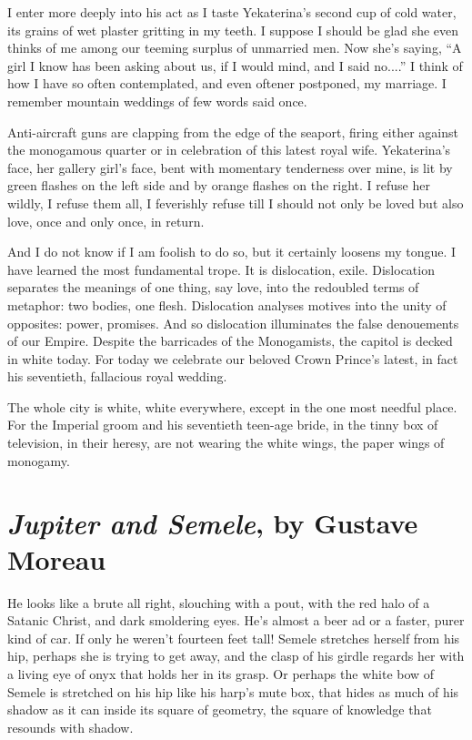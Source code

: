 \documentclass[english,11pt,letterpaper,onecolumn,parskip=full]{scrbook}
\begin{document}
	I enter more deeply into his act as I taste Yekaterina's second cup of cold water, its grains of wet plaster gritting in my teeth.  I suppose I should be glad she even thinks of me among our teeming surplus of unmarried men.  Now she's saying, ``A girl I know has been asking about us, if I would mind, and I said no....''  I think of how I have so often contemplated, and even oftener postponed, my marriage.  I remember mountain weddings of few words said once.

	Anti-aircraft guns are clapping from the edge of the seaport, firing either against the monogamous quarter or in celebration of this latest royal wife.  Yekaterina's face, her gallery girl's face, bent with momentary tenderness over mine, is lit by green flashes on the left side and by orange flashes on the right.  I refuse her wildly, I refuse them all, I feverishly refuse till I should not only be loved but also love, once and only once, in return.

	And I do not know if I am foolish to do so, but it certainly loosens my tongue.  I have learned the most fundamental trope.  It is dislocation, exile.  Dislocation separates the meanings of one thing, say love, into the redoubled terms of metaphor:  two bodies, one flesh.  Dislocation analyses motives into the unity of opposites:  power, promises.  And so dislocation illuminates the false denouements of our Empire.  Despite the barricades of the Monogamists, the capitol is decked in white today.  For today we celebrate our beloved Crown Prince's latest, in fact his seventieth, fallacious royal wedding.

	The whole city is white, white everywhere, except in the one most needful place.  For the Imperial groom and his seventieth teen-age bride, in the tinny box of television, in their heresy, are not wearing the white wings, the paper wings of monogamy.


\newpage
\section{\emph{Jupiter and Semele}, by Gustave Moreau}

He looks like a brute all right, slouching with a pout, with the red halo of a Satanic Christ, and dark smoldering eyes.  He's almost a beer ad or a faster, purer kind of car.  If only he weren't fourteen feet tall!
Semele stretches herself from his hip, perhaps she is trying to get away, and the clasp of his girdle regards her with a living eye of onyx that holds her in its grasp.  Or perhaps the white bow of Semele is stretched on his hip like his harp's mute box, that hides as much of his shadow as it can inside its square of geometry, the square of knowledge that resounds with shadow.
\end{document}
